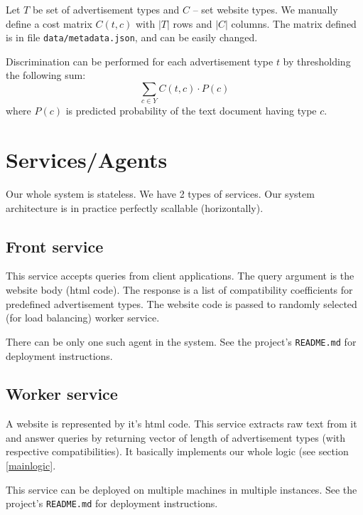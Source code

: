 \documentclass[a4paper]{article}
\begin{document}
Let $T$ be set of advertisement types and $C$ -- set website types.
We manually define a cost matrix $C(t, c)$ 
with $|T|$ rows and $|C|$ columns.
The matrix defined is in file \texttt{data/metadata.json},
and can be easily changed.

Discrimination can be performed for each advertisement type $t$
by thresholding the following sum:
\begin{equation}
    \sum_{c\in{Y}} {C(t, c) \cdot P(c)}
\end{equation}
where $P(c)$ is predicted probability of the text document having type $c$.



\section{Services/Agents}
Our whole system is stateless.
We have 2 types of services.
Our system architecture is in practice perfectly scallable (horizontally).

\subsection{Front service}

This service accepts queries from client applications.
The query argument is the website body (html code).
The response is a list of compatibility coefficients for predefined advertisement types.
The website code is passed to randomly selected (for load balancing) worker service.

There can be only one such agent in the system.
See the project's \texttt{README.md} for deployment instructions.


\subsection{Worker service}
A website is represented by it's html code.
This service extracts raw text from it and answer queries by returning vector of length of advertisement types
(with respective compatibilities).
It basically implements our whole logic (see section \ref{mainlogic}.

This service can be deployed on multiple machines in multiple instances.
See the project's \texttt{README.md} for deployment instructions.
\end{document}
